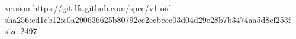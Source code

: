 version https://git-lfs.github.com/spec/v1
oid sha256:cd1cb12fc0a290636625b80792ce2ecbeec03d04d29e28b7b3474aa5d8cf253f
size 2497
